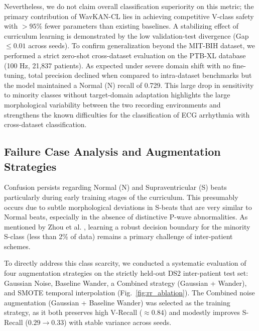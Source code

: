 \documentclass[journal,twoside,web]{ieeecolor}
\begin{document}
Nevertheless, we do not claim overall classification superiority on this metric; the primary contribution of WavKAN-CL lies in achieving competitive V-class safety with $>95\%$ fewer parameters than existing baselines. A stabilizing effect of curriculum learning is demonstrated by the low validation-test divergence (Gap $\le 0.01$ across seeds). To confirm generalization beyond the MIT-BIH dataset, we performed a strict zero-shot cross-dataset evaluation on the PTB-XL database (100 Hz, 21,837 patients). As expected under severe domain shift with no fine-tuning, total precision declined when compared to intra-dataset benchmarks but the model maintained a Normal (N) recall of 0.729. This large drop in sensitivity to minority classes without target-domain adaptation highlights the large morphological variability between the two recording environments and strengthens the known difficulties for the classification of ECG arrhythmia with cross-dataset classification.

\subsection{Failure Case Analysis and Augmentation Strategies}
Confusion persists regarding Normal (N) and Supraventricular (S) beats particularly during early training stages of the curriculum. This presumably occurs due to subtle morphological deviations in S-beats that are very similar to Normal beats, especially in the absence of distinctive P-wave abnormalities. As mentioned by Zhou et al. \cite{zhou_inter-patient_2024}, learning a robust decision boundary for the minority S-class (less than 2\% of data) remains a primary challenge of inter-patient schemes.

To directly address this class scarcity, we conducted a systematic evaluation of four augmentation strategies on the strictly held-out DS2 inter-patient test set: Gaussian Noise, Baseline Wander, a Combined strategy (Gaussian + Wander), and SMOTE temporal interpolation (Fig.~\ref{fig:rr_ablation}). The Combined noise augmentation (Gaussian + Baseline Wander) was selected as the training strategy, as it both preserves high V-Recall ($\approx 0.84$) and modestly improves S-Recall ($0.29 \to 0.33$) with stable variance across seeds.
\end{document}
